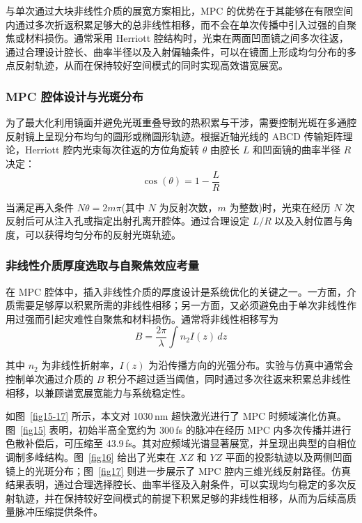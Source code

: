 与单次通过大块非线性介质的展宽方案相比，MPC 的优势在于其能够在有限空间内通过多次折返积累足够大的总非线性相移，而不会在单次传播中引入过强的自聚焦或材料损伤。通常采用 Herriott 腔结构时，光束在两面凹面镜之间多次往返，通过合理设计腔长、曲率半径以及入射偏轴条件，可以在镜面上形成均匀分布的多点反射轨迹，从而在保持较好空间模式的同时实现高效谱宽展宽。





\subsubsection{MPC 腔体设计与光斑分布}

为了最大化利用镜面并避免光斑重叠导致的热积累与干涉，需要控制光斑在多通腔反射镜上呈现分布均匀的圆形或椭圆形轨迹。根据近轴光线的 ABCD 传输矩阵理论，Herriott 腔内光束每次往返的方位角旋转 $\theta$ 由腔长 $L$ 和凹面镜的曲率半径 $R$ 决定：
\begin{equation}
    \cos(\theta) = 1 - \frac{L}{R}
\end{equation}

当满足再入条件 $N\theta = 2m\pi$(其中 $N$ 为反射次数，$m$ 为整数)时，光束在经历 $N$ 次反射后可从注入孔或指定出射孔离开腔体。通过合理设定 $L/R$ 以及入射位置与角度，可以获得均匀分布的反射光斑轨迹。


\subsubsection{非线性介质厚度选取与自聚焦效应考量}

在 MPC 腔体中，插入非线性介质的厚度设计是系统优化的关键之一。一方面，介质需要足够厚以积累所需的非线性相移；另一方面，又必须避免由于单次非线性作用过强而引起灾难性自聚焦和材料损伤。通常将非线性相移写为
\begin{equation}
    B = \frac{2\pi}{\lambda}\int n_2 I(z)\,dz
\end{equation}

其中 $n_2$ 为非线性折射率，$I(z)$ 为沿传播方向的光强分布。实验与仿真中通常会控制单次通过介质的 $B$ 积分不超过适当阈值，同时通过多次往返来积累总非线性相移，以兼顾谱宽展宽能力与系统稳定性。

如图~\ref{fig15-17} 所示，本文对 1030\,nm 超快激光进行了 MPC 时频域演化仿真。图~\ref{fig15} 表明，初始半高全宽约为 300\,fs 的脉冲在经历 MPC 内多次传播并进行色散补偿后，可压缩至 43.9\,fs。其对应频域光谱显著展宽，并呈现出典型的自相位调制多峰结构。图~\ref{fig16} 给出了光束在 $XZ$ 和 $YZ$ 平面的投影轨迹以及两侧凹面镜上的光斑分布；图~\ref{fig17} 则进一步展示了 MPC 腔内三维光线反射路径。仿真结果表明，通过合理选择腔长、曲率半径及入射条件，可以实现均匀稳定的多次反射轨迹，并在保持较好空间模式的前提下积累足够的非线性相移，从而为后续高质量脉冲压缩提供条件。

